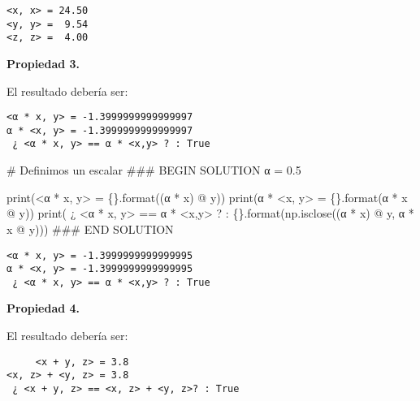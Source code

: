 \documentclass[
  letterpaper,
  DIV=11,
  numbers=noendperiod]{scrreprt}
\newenvironment{Shaded}{\begin{snugshade}}{\end{snugshade}}
\newcommand{\BuiltInTok}[1]{\textcolor[rgb]{0.00,0.23,0.31}{#1}}
\newcommand{\CommentTok}[1]{\textcolor[rgb]{0.37,0.37,0.37}{#1}}
\newcommand{\FloatTok}[1]{\textcolor[rgb]{0.68,0.00,0.00}{#1}}
\newcommand{\NormalTok}[1]{\textcolor[rgb]{0.00,0.23,0.31}{#1}}
\newcommand{\OperatorTok}[1]{\textcolor[rgb]{0.37,0.37,0.37}{#1}}
\newcommand{\RegionMarkerTok}[1]{\textcolor[rgb]{0.00,0.23,0.31}{#1}}
\newcommand{\SpecialCharTok}[1]{\textcolor[rgb]{0.37,0.37,0.37}{#1}}
\newcommand{\StringTok}[1]{\textcolor[rgb]{0.13,0.47,0.30}{#1}}
\begin{document}
\begin{verbatim}
<x, x> = 24.50
<y, y> =  9.54
<z, z> =  4.00
\end{verbatim}

\textbf{Propiedad 3.}

El resultado debería ser:

\begin{verbatim}
<α * x, y> = -1.3999999999999997
α * <x, y> = -1.3999999999999997
 ¿ <α * x, y> == α * <x,y> ? : True
\end{verbatim}

\begin{Shaded}
\begin{Highlighting}[]
\CommentTok{\# Definimos un escalar}
\CommentTok{\#\#\# }\RegionMarkerTok{BEGIN}\CommentTok{ SOLUTION}
\NormalTok{α }\OperatorTok{=} \FloatTok{0.5}

\BuiltInTok{print}\NormalTok{(}\StringTok{\textquotesingle{}\textless{}α * x, y\textgreater{} = }\SpecialCharTok{\{\}}\StringTok{\textquotesingle{}}\NormalTok{.}\BuiltInTok{format}\NormalTok{((α }\OperatorTok{*}\NormalTok{ x) }\OperatorTok{@}\NormalTok{ y))}
\BuiltInTok{print}\NormalTok{(}\StringTok{\textquotesingle{}α * \textless{}x, y\textgreater{} = }\SpecialCharTok{\{\}}\StringTok{\textquotesingle{}}\NormalTok{.}\BuiltInTok{format}\NormalTok{(α }\OperatorTok{*}\NormalTok{ x }\OperatorTok{@}\NormalTok{ y))}
\BuiltInTok{print}\NormalTok{(}\StringTok{\textquotesingle{} ¿ \textless{}α * x, y\textgreater{} == α * \textless{}x,y\textgreater{} ? : }\SpecialCharTok{\{\}}\StringTok{\textquotesingle{}}\NormalTok{.}\BuiltInTok{format}\NormalTok{(np.isclose((α }\OperatorTok{*}\NormalTok{ x) }\OperatorTok{@}\NormalTok{ y, α }\OperatorTok{*}\NormalTok{ x }\OperatorTok{@}\NormalTok{ y)))}
\CommentTok{\#\#\# }\RegionMarkerTok{END}\CommentTok{ SOLUTION}
\end{Highlighting}
\end{Shaded}

\begin{verbatim}
<α * x, y> = -1.3999999999999995
α * <x, y> = -1.3999999999999995
 ¿ <α * x, y> == α * <x,y> ? : True
\end{verbatim}

\textbf{Propiedad 4.}

El resultado debería ser:

\begin{verbatim}
     <x + y, z> = 3.8
<x, z> + <y, z> = 3.8
 ¿ <x + y, z> == <x, z> + <y, z>? : True
\end{verbatim}
\end{document}
